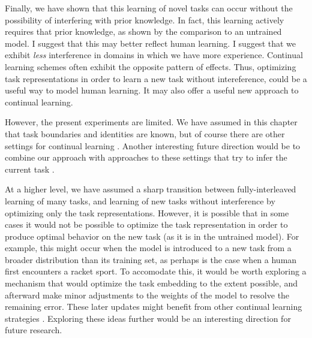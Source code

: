 Finally, we have shown that this learning of novel tasks can occur without the possibility of interfering with prior knowledge. In fact, this learning actively requires that prior knowledge, as shown by the comparison to an untrained model. I suggest that this may better reflect human learning. I suggest that we exhibit \emph{less} interference in domains in which we have more experience. Continual learning schemes often exhibit the opposite pattern of effects. Thus, optimizing task representations in order to learn a new task without intereference, could be a useful way to model human learning. It may also offer a useful new approach to continual learning.\par 
However, the present experiments are limited. We have assumed in this chapter that task boundaries and identities are known, but of course there are other settings for continual learning \citep{Ven2018}. Another interesting future direction would be to combine our approach with approaches to these settings that try to infer the current task \citep[e.g][]{Nagabandi2019}. \par
At a higher level, we have assumed a sharp transition between fully-interleaved learning of many tasks, and learning of new tasks without interference by optimizing only the task representations. However, it is possible that in some cases it would not be possible to optimize the task representation in order to produce optimal behavior on the new task (as it is in the untrained model). For example, this might occur when the model is introduced to a new task from a broader distribution than its training set, as perhaps is the case when a human first encounters a racket sport. To accomodate this, it would be worth exploring a mechanism that would optimize the task embedding to the extent possible, and afterward make minor adjustments to the weights of the model to resolve the remaining error. These later updates might benefit from other continual learning strategies \citep[e.g.][]{Kirkpatrick2016, Zenke2017}. Exploring these ideas further would be an interesting direction for future research.\par
